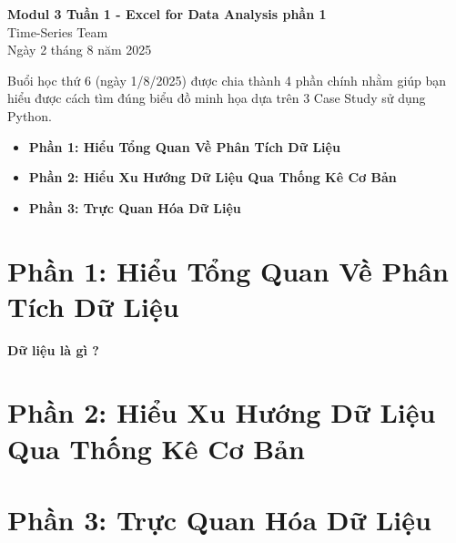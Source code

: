 \documentclass[11pt]{article}
\renewcommand{\maketitle}{%
    \begin{center}
        \fontsize{18}{20}\selectfont\textbf{Modul 3 Tuần 1 - Excel for Data Analysis phần 1}\\[1em]
        \fontsize{14}{16}\selectfont Time-Series Team\\[0.5em]
        \fontsize{14}{16}\selectfont Ngày 2 tháng 8 năm 2025
    \end{center}
    \vspace{1.5em} %
}
\begin{document}
\maketitle %


\begin{summarybox}
   Buổi học thứ 6 (ngày 1/8/2025) được chia thành 4 phần chính nhằm giúp bạn hiểu được cách tìm đúng biểu đồ minh họa dựa trên 3 Case Study sử dụng Python.
    \begin{itemize}
        \item \textbf{Phần 1: Hiểu Tổng Quan Về Phân Tích Dữ Liệu}
        \item \textbf{Phần 2: Hiểu Xu Hướng Dữ Liệu Qua Thống Kê Cơ Bản}
        \item \textbf{Phần 3: Trực Quan Hóa Dữ Liệu}
    \end{itemize}
\end{summarybox}

\section{Phần 1: Hiểu Tổng Quan Về Phân Tích Dữ Liệu}
\textbf{Dữ liệu là gì ?}

\section{Phần 2: Hiểu Xu Hướng Dữ Liệu Qua Thống Kê Cơ Bản}
\section{Phần 3: Trực Quan Hóa Dữ Liệu}
\end{document}
